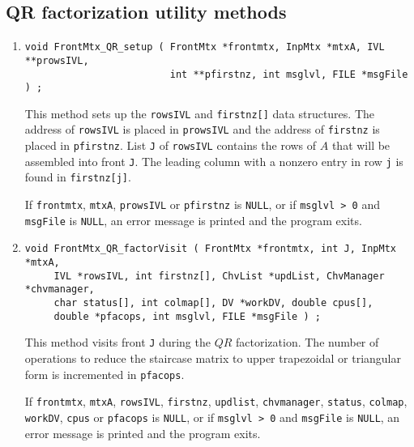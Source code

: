\subsection{QR factorization utility methods}
\label{subsection:FrontMtx:proto:utilityQR}
\par
\begin{enumerate}
\item
\begin{verbatim}
void FrontMtx_QR_setup ( FrontMtx *frontmtx, InpMtx *mtxA, IVL **prowsIVL,
                         int **pfirstnz, int msglvl, FILE *msgFile ) ;
\end{verbatim}
This method sets up the {\tt rowsIVL} and {\tt firstnz[]} data
structures.
The address of {\tt rowsIVL} is placed in {\tt *prowsIVL}
and the address of {\tt firstnz} is placed in {\tt *pfirstnz}.
List {\tt J} of {\tt rowsIVL} contains the rows of $A$ that will be
assembled into front {\tt J}.
The leading column with a nonzero entry in row {\tt j} is found in
{\tt firstnz[j]}.
\par {}
If {\tt frontmtx}, {\tt mtxA}, {\tt prowsIVL} or {\tt pfirstnz} 
is {\tt NULL},
or if {\tt msglvl > 0} and {\tt msgFile} is {\tt NULL},
an error message is printed and the program exits.
\item
\begin{verbatim}
void FrontMtx_QR_factorVisit ( FrontMtx *frontmtx, int J, InpMtx *mtxA, 
     IVL *rowsIVL, int firstnz[], ChvList *updList, ChvManager *chvmanager,
     char status[], int colmap[], DV *workDV, double cpus[], 
     double *pfacops, int msglvl, FILE *msgFile ) ;
\end{verbatim}
This method visits front {\tt J} during the $QR$ factorization.
The number of operations to reduce the staircase matrix to upper
trapezoidal or triangular form is incremented in {\tt *pfacops}.
\par {}
If {\tt frontmtx}, {\tt mtxA}, {\tt rowsIVL}, {\tt firstnz},
{\tt updlist}, {\tt chvmanager}, {\tt status}, {\tt colmap},
{\tt workDV}, {\tt cpus} or {\tt pfacops} is {\tt NULL},
or if {\tt msglvl > 0} and {\tt msgFile} is {\tt NULL},
an error message is printed and the program exits.

\end{enumerate}
